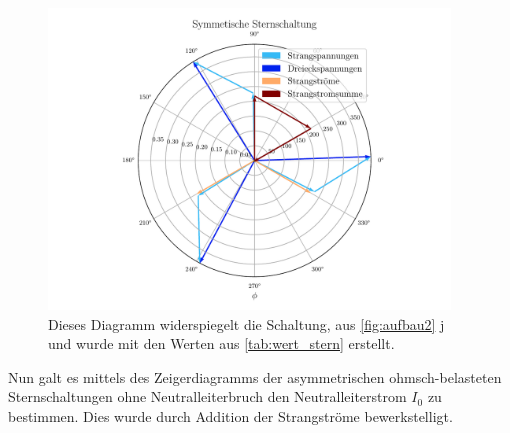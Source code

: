\documentclass[12pt,english,ngerman]{scrartcl}
\begin{document}
\begin{figure}[H]
	\begin{center}
		\includegraphics[width = 0.95\textwidth]{figures/zeigerSternSym.pdf}
	\end{center}
	\caption[Zeigerdiagramm einer symmetrisch ohmsch-belastete Sternschaltung]{Dieses
		Diagramm widerspiegelt die Schaltung, aus \autoref{fig:aufbau2} j und wurde mit
		den Werten aus \autoref{tab:wert_stern} erstellt.
	}\label{fig:zeigerSternSym}
\end{figure}

Nun galt es mittels des Zeigerdiagramms der asymmetrischen ohmsch-belasteten
Sternschaltungen ohne Neutralleiterbruch den Neutralleiterstrom $I_0$ zu
bestimmen. Dies wurde durch Addition der Strangströme bewerkstelligt.
\end{document}
